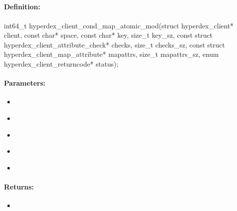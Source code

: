 \pagebreak
\subsection{}
\label{api:c:cond_map_atomic_mod}


\paragraph{Definition:}
\begin{ccode}
int64_t hyperdex_client_cond_map_atomic_mod(struct hyperdex_client* client,
        const char* space,
        const char* key, size_t key_sz,
        const struct hyperdex_client_attribute_check* checks, size_t checks_sz,
        const struct hyperdex_client_map_attribute* mapattrs, size_t mapattrs_sz,
        enum hyperdex_client_returncode* status);
\end{ccode}

\paragraph{Parameters:}
\begin{itemize}[noitemsep]
\item {}\\

\item {}\\

\item {}\\

\item {}\\

\item {}\\

\end{itemize}

\paragraph{Returns:}
\begin{itemize}[noitemsep]
\item {}\\

\end{itemize}

